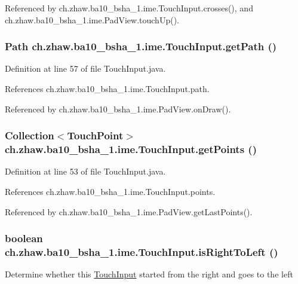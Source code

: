 Referenced by ch.zhaw.ba10\_\-bsha\_\-1.ime.TouchInput.crosses(), and ch.zhaw.ba10\_\-bsha\_\-1.ime.PadView.touchUp().\hypertarget{classch_1_1zhaw_1_1ba10__bsha__1_1_1ime_1_1TouchInput_a109b88f906f350c5d4c25abc5fd6f95e}{
\subsubsection[{getPath}]{\setlength{\rightskip}{0pt plus 5cm}Path ch.zhaw.ba10\_\-bsha\_\-1.ime.TouchInput.getPath ()}}
\label{classch_1_1zhaw_1_1ba10__bsha__1_1_1ime_1_1TouchInput_a109b88f906f350c5d4c25abc5fd6f95e}


Definition at line 57 of file TouchInput.java.

References ch.zhaw.ba10\_\-bsha\_\-1.ime.TouchInput.path.

Referenced by ch.zhaw.ba10\_\-bsha\_\-1.ime.PadView.onDraw().\hypertarget{classch_1_1zhaw_1_1ba10__bsha__1_1_1ime_1_1TouchInput_a12f25294b93d8e24ab3186f2c3e8e1b9}{
\subsubsection[{getPoints}]{\setlength{\rightskip}{0pt plus 5cm}Collection$<${\bf TouchPoint}$>$ ch.zhaw.ba10\_\-bsha\_\-1.ime.TouchInput.getPoints ()}}
\label{classch_1_1zhaw_1_1ba10__bsha__1_1_1ime_1_1TouchInput_a12f25294b93d8e24ab3186f2c3e8e1b9}


Definition at line 53 of file TouchInput.java.

References ch.zhaw.ba10\_\-bsha\_\-1.ime.TouchInput.points.

Referenced by ch.zhaw.ba10\_\-bsha\_\-1.ime.PadView.getLastPoints().\hypertarget{classch_1_1zhaw_1_1ba10__bsha__1_1_1ime_1_1TouchInput_a128099435135aeaa5d2aac9901b3ec3a}{
\subsubsection[{isRightToLeft}]{\setlength{\rightskip}{0pt plus 5cm}boolean ch.zhaw.ba10\_\-bsha\_\-1.ime.TouchInput.isRightToLeft ()}}
\label{classch_1_1zhaw_1_1ba10__bsha__1_1_1ime_1_1TouchInput_a128099435135aeaa5d2aac9901b3ec3a}
Determine whether this \hyperlink{classch_1_1zhaw_1_1ba10__bsha__1_1_1ime_1_1TouchInput}{TouchInput} started from the right and goes to the left

